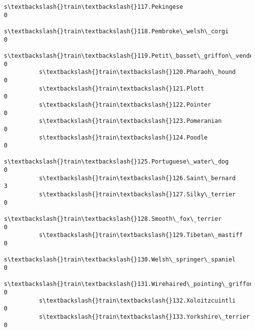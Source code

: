 \documentclass[11pt]{article}
\begin{document}
\begin{Verbatim}[commandchars=\\\{\}]
          s\textbackslash{}train\textbackslash{}117.Pekingese                                                   0   
          s\textbackslash{}train\textbackslash{}118.Pembroke\_welsh\_corgi                                        0   
          s\textbackslash{}train\textbackslash{}119.Petit\_basset\_griffon\_vendeen                                0   
          s\textbackslash{}train\textbackslash{}120.Pharaoh\_hound                                               0   
          s\textbackslash{}train\textbackslash{}121.Plott                                                       0   
          s\textbackslash{}train\textbackslash{}122.Pointer                                                     0   
          s\textbackslash{}train\textbackslash{}123.Pomeranian                                                  0   
          s\textbackslash{}train\textbackslash{}124.Poodle                                                      0   
          s\textbackslash{}train\textbackslash{}125.Portuguese\_water\_dog                                        0   
          s\textbackslash{}train\textbackslash{}126.Saint\_bernard                                               3   
          s\textbackslash{}train\textbackslash{}127.Silky\_terrier                                               0   
          s\textbackslash{}train\textbackslash{}128.Smooth\_fox\_terrier                                          0   
          s\textbackslash{}train\textbackslash{}129.Tibetan\_mastiff                                             0   
          s\textbackslash{}train\textbackslash{}130.Welsh\_springer\_spaniel                                      0   
          s\textbackslash{}train\textbackslash{}131.Wirehaired\_pointing\_griffon                                 0   
          s\textbackslash{}train\textbackslash{}132.Xoloitzcuintli                                              0   
          s\textbackslash{}train\textbackslash{}133.Yorkshire\_terrier                                           0   
          

\end{Verbatim}
\end{document}
